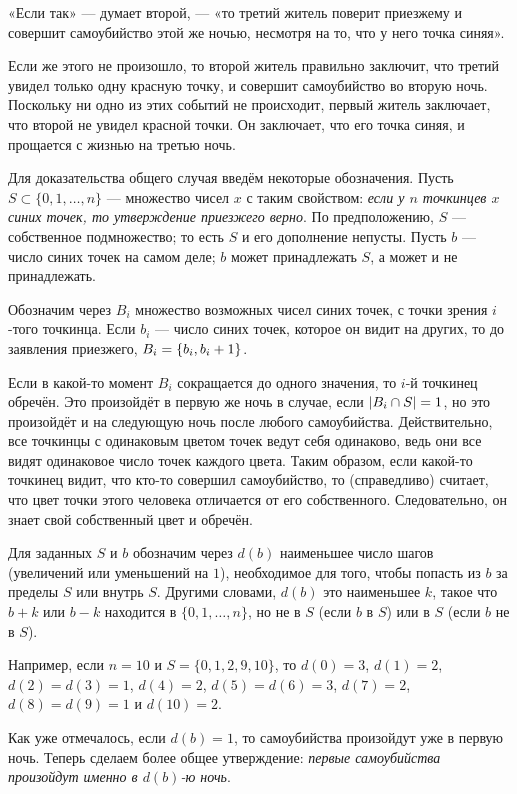 «Если так» --- думает второй, --- «то третий житель поверит приезжему и совершит самоубийство этой же ночью, несмотря на то, что у него точка синяя».

Если же этого не произошло, то второй житель правильно заключит, что третий увидел только одну красную точку, и совершит самоубийство во вторую ночь.
Поскольку ни одно из этих событий не происходит, первый житель заключает, что второй не увидел красной точки.
Он заключает, что его точка синяя, и прощается с жизнью на третью ночь.

Для доказательства общего случая введём некоторые обозначения.
Пусть $S\subset\{0,1,\dots,n\}$ --- множество чисел $x$ с таким свойством: \emph{если у $n$ точкинцев $x$ синих точек, то утверждение приезжего верно}.
По предположению, $S$ --- собственное подмножество; то есть $S$ и его дополнение непусты.
Пусть $b$ --- число синих точек на самом деле;
$b$ может принадлежать $S$, а может и не принадлежать.

Обозначим через $B_i$ множество возможных чисел синих точек, с точки зрения $i$-того точкинца.
Если $b_i$ --- число синих точек, которое он видит на других, то до заявления приезжего, $B_i=\{b_i,b_i\z+1\}$.

Если в какой-то момент $B_i$ сокращается до одного значения, то $i$-й точкинец обречён.
Это произойдёт в первую же ночь в случае, если  $|B_i\z\cap S|=1$, но это произойдёт и на следующую ночь после любого самоубийства.
Действительно, все точкинцы с одинаковым цветом точек ведут себя одинаково, ведь они все видят одинаковое число точек каждого цвета.
Таким образом, если какой-то точкинец видит, что кто-то совершил самоубийство, то (справедливо) считает, что цвет точки этого человека отличается от его собственного. 
Следовательно, он знает свой собственный цвет и обречён.

Для заданных $S$ и $b$ обозначим через $d(b)$ наименьшее число шагов (увеличений или уменьшений на $1$), необходимое для того, чтобы попасть из $b$ за пределы $S$ или внутрь $S$.
Другими словами, $d(b)$ это наименьшее $k$, такое что $b+k$ или $b-k$ находится в $\{0, 1, \dots, n\}$, но не в $S$ (если $b$ в  $S$) или в $S$ (если $b$ не в $S$).

Например, если $n=10$ и 
$S=\{0,1,2,9,10\}$, то 
$d(0)=3$, 
$d(1)=2$, 
$d(2)=d(3)=1$, 
$d(4)=2$, 
$d(5)=d(6)=3$, 
$d(7)=2$, 
$d(8)=d(9)=1$ и
$d(10)=2$.

Как уже отмечалось, если $d(b)=1$, то самоубийства произойдут уже в первую ночь.
Теперь сделаем более общее утверждение: \emph{первые самоубийства произойдут именно в $d(b)$-ю ночь}.

